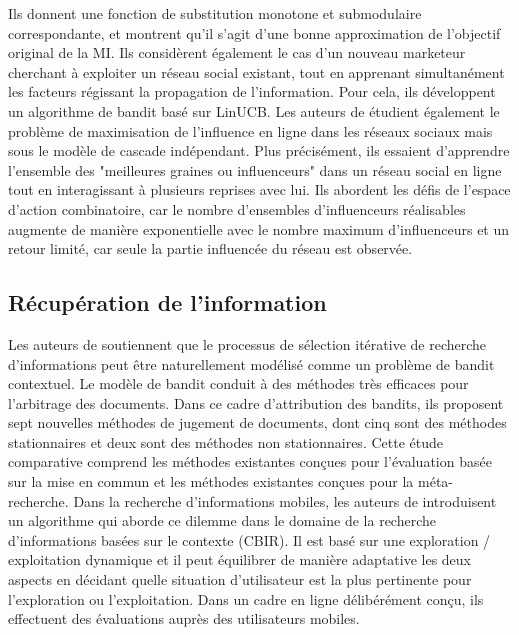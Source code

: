 \documentclass[conference]{IEEEtran}
\newcommand{\1}[1]{\mathbbm{1}_{\left\{#1\right\}}}
\begin{document}
Ils donnent une fonction de substitution monotone et submodulaire correspondante, et montrent qu'il s'agit d'une bonne approximation de l'objectif original de la MI. Ils considèrent également le cas d'un nouveau marketeur cherchant à exploiter un réseau social existant, tout en apprenant simultanément les facteurs régissant la propagation de l'information. Pour cela, ils développent un algorithme de bandit basé sur LinUCB. Les auteurs de \cite{wen2017online} étudient également le problème de maximisation de l'influence en ligne dans les réseaux sociaux mais sous le modèle de cascade indépendant. Plus précisément, ils essaient d'apprendre l'ensemble des "meilleures graines ou influenceurs" dans un réseau social en ligne tout en interagissant à plusieurs reprises avec lui. Ils abordent les défis de l'espace d'action combinatoire, car le nombre d'ensembles d'influenceurs réalisables augmente de manière exponentielle avec le nombre maximum d'influenceurs et un retour limité, car seule la partie influencée du réseau est observée. 

\subsection{Récupération de l'information}
Les auteurs de \cite{losada2017multi} soutiennent que le processus de sélection itérative de recherche d'informations peut être naturellement modélisé comme un problème de bandit contextuel. Le modèle de bandit conduit à des méthodes très efficaces pour l'arbitrage des documents. Dans ce cadre d'attribution des bandits, ils proposent sept nouvelles méthodes de jugement de documents, dont cinq sont des méthodes stationnaires et deux sont des méthodes non stationnaires. Cette étude comparative comprend les méthodes existantes conçues pour l'évaluation basée sur la mise en commun et les méthodes existantes conçues pour la méta-recherche. Dans la recherche d'informations mobiles, les auteurs de \cite{bouneffouf2013contextual} introduisent un algorithme qui aborde ce dilemme dans le domaine de la recherche d'informations basées sur le contexte (CBIR). Il est basé sur une exploration / exploitation dynamique et il peut équilibrer de manière adaptative les deux aspects en décidant quelle situation d’utilisateur est la plus pertinente pour l’exploration ou l’exploitation. Dans un cadre en ligne délibérément conçu, ils effectuent des évaluations auprès des utilisateurs mobiles.
\end{document}
